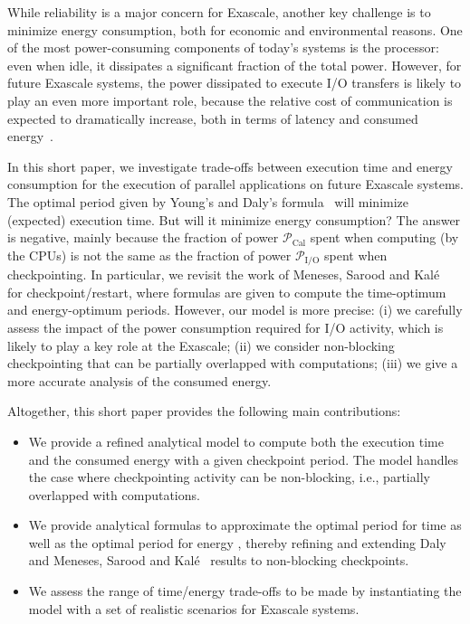 \documentclass[a4paper]{article}
\newcommand{\ema}[1]{\ensuremath{#1}\xspace}
\newcommand{\power}[1][]{\ema{\mathcal{P}_{\text{#1}}}}
\newcommand{\pCal}{\power[Cal]}
\newcommand{\pIO}{\power[I/O]}
\begin{document}
While reliability is a major concern for Exascale, another key challenge is to minimize 
energy consumption, both for economic and environmental reasons. 
One of the most power-consuming components of today's systems is the processor: 
even when idle, it dissipates a significant fraction of the total power. However, for future
Exascale systems, the power dissipated to execute I/O transfers
is likely to play an even more important role, because the relative cost of communication is
expected to dramatically increase, both in terms of latency and consumed energy~\cite{Shalf2011}. 

In this short paper, we investigate trade-offs between execution time and energy consumption
for the execution of parallel applications on future Exascale systems. 
The optimal period  given by Young's and Daly's formula~\cite{young74,daly04} 
will minimize (expected) execution time. But will it minimize energy consumption?
The answer is negative, mainly because the fraction of power \pCal spent when computing (by the CPUs) is not 
the same as the fraction of power \pIO spent when checkpointing. 
In particular, we revisit the work of Meneses, Sarood and Kalé~\cite{Kale2012} for checkpoint/restart, where formulas 
are given to compute the time-optimum and energy-optimum periods. 
However, our model is more precise: (i) we carefully assess  the impact of the
power consumption required for I/O activity, which is likely to play a key role
at the Exascale; (ii) we consider non-blocking checkpointing that can be partially
overlapped with computations; (iii) we give a more accurate analysis of the consumed energy.

Altogether, this short paper provides the following main contributions:
\begin{itemize}
\item We provide a refined analytical model to compute both the execution time and the
consumed energy with a given checkpoint 
period. The model handles the case where checkpointing activity can be non-blocking, i.e.,  
partially overlapped with computations. 
\item We provide analytical formulas to approximate the optimal period for time 
 as well as the optimal period  for energy ,  thereby refining and extending
Daly~\cite{daly04} and Meneses, Sarood and Kalé~\cite{Kale2012} results to
non-blocking checkpoints.
\item We assess the range of time/energy trade-offs to be made by instantiating the model 
with a set of realistic scenarios for Exascale systems. 
\end{itemize}
\end{document}
